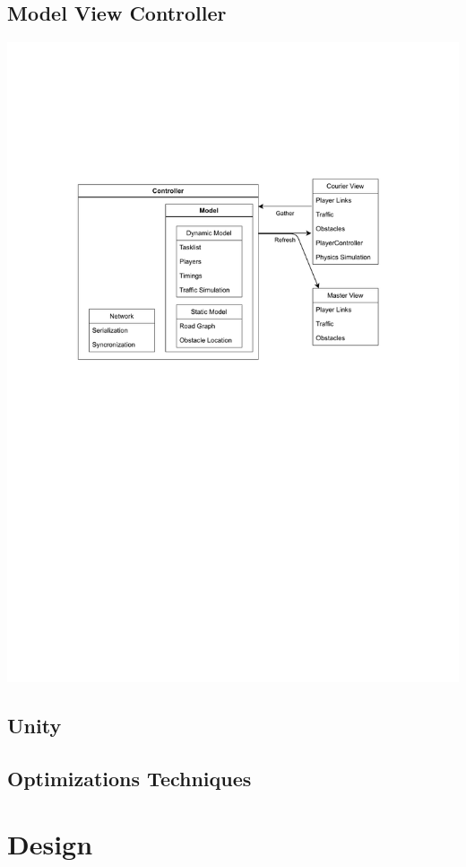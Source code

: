 \documentclass{article}
\begin{document}
\subsection{Model View Controller}
\includegraphics[width=\textwidth]{game architecture}
\subsection{Unity}
\subsection{Optimizations Techniques}

\clearpage

\section{Design}
\end{document}
